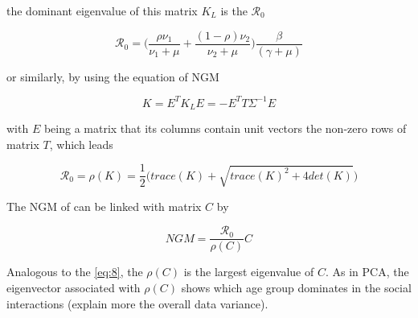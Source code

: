 \documentclass[12pt]{article}
\begin{document}
the dominant eigenvalue of this matrix $K_{L}$ is the $\mathcal{R_{0}}$


\begin{equation}
\mathcal{R}_{0} = \bigg( \frac{\rho \nu_{1}}{\nu_{1} + \mu} + \frac{(1-\rho) \nu_{2}}{\nu_{2} + \mu}  \bigg) \frac{\beta}{(\gamma + \mu)}
\end{equation}

or similarly, by using the equation of NGM

\begin{equation}
K=E^{T}K_{L}E=-E^{T}T\Sigma^{-1}E
\end{equation}

with $E$ being a matrix that its columns contain unit vectors the non-zero rows of matrix $T$, which leads

\begin{equation}
\mathcal{R}_{0}  = \rho (K) = \frac{1}{2} \bigg( trace(K) + \sqrt{trace(K)^{2} + 4det(K)} \bigg)
\label{eq:8}
\end{equation}

The NGM of \cite{Diekmann:2010} can be linked with \cite{Klepac2020} matrix $C$ by 

\begin{equation}
NGM  = \frac{\mathcal{R}_{0}}{\rho(C)} C
\end{equation}

Analogous to the \ref{eq:8}, the $\rho(C)$ is the largest eigenvalue of $C$. As in PCA, the eigenvector associated with $\rho(C)$ shows which age group dominates in the social interactions (explain more the overall data variance). 





\end{document}
